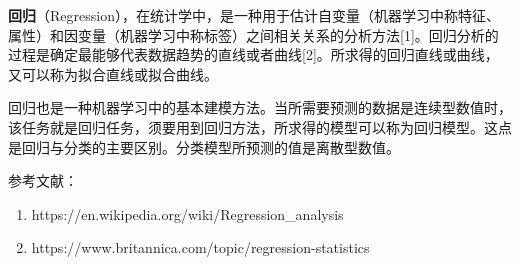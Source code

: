 
\textbf{回归}（Regression），在统计学中，是一种用于估计自变量（机器学习中称特征、属性）和因变量（机器学习中称标签）之间相关关系的分析方法[1]。回归分析的过程是确定最能够代表数据趋势的直线或者曲线[2]。所求得的回归直线或曲线，又可以称为拟合直线或拟合曲线。

回归也是一种机器学习中的基本建模方法。当所需要预测的数据是连续型数值时，该任务就是回归任务，须要用到回归方法，所求得的模型可以称为回归模型。这点是回归与分类的主要区别。分类模型所预测的值是离散型数值。



参考文献：
\begin{enumerate}
\item https://en.wikipedia.org/wiki/Regression_analysis
\item https://www.britannica.com/topic/regression-statistics
\end{enumerate}